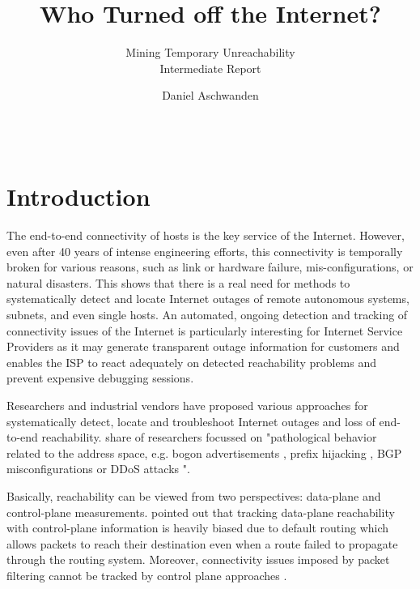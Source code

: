 \documentclass{sigcomm-alternate}
\begin{document}
 
\title{Who Turned off the Internet?} 
\subtitle{Mining Temporary Unreachability\\ \Large Intermediate Report }

\author{ \alignauthor Daniel Aschwanden\\
\\
\\
}

\maketitle 
\section{Introduction}
The end-to-end connectivity of hosts is the key service of the
Internet. However, even after 40 years of intense engineering efforts,
this connectivity is temporally broken for various reasons, such as link
or hardware failure, mis-configurations, or natural disasters.
This shows that there is a real need for methods to systematically detect
and locate Internet outages of remote autonomous systems, subnets,
and even single hosts. An automated, ongoing detection and tracking
of connectivity issues of the Internet is particularly interesting
for Internet Service Providers as it may generate transparent outage
information for customers and enables the ISP to react adequately on
detected reachability problems and prevent expensive debugging sessions.

Researchers and industrial vendors have proposed various approaches for
systematically detect, locate and troubleshoot Internet outages and loss
of end-to-end reachability. %
share of researchers focussed on "pathological behavior related to the
address space, e.g. bogon advertisements \cite{Feamster:2005}, prefix
hijacking \cite{Zhang:2010}, BGP misconfigurations \cite{Mahajan:2002}
or DDoS attacks \cite{Chen:2001}"\cite{Bush:Optometry}.

Basically, reachability can be viewed from two perspectives: data-plane
and control-plane measurements. \cite{Bush:Optometry} pointed out
that tracking data-plane reachability with control-plane information is
heavily biased due to default routing which allows packets to reach their
destination even when a route failed to propagate through the routing
system. Moreover, connectivity issues imposed by packet filtering cannot
be tracked by control plane approaches \cite{Dainotti:2011:ACI}.
\end{document}
